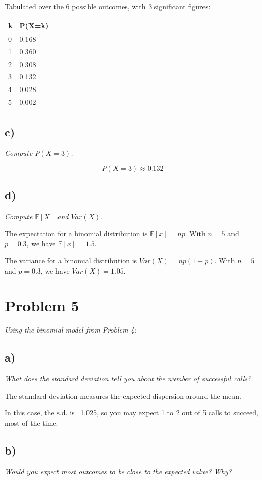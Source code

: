 \documentclass[11pt, oneside]{article}   	%
\begin{document}
Tabulated over the 6 possible outcomes, with 3 significant figures:

\begin{tabular}{|l|l|}\hline
k&P(X=k)\\\hline
0&0.168\\\hline
1&0.360\\\hline
2&0.308\\\hline
3&0.132\\\hline
4&0.028\\\hline
5&0.002\\\hline
\end{tabular}

\subsection*{c)}
\emph{Compute $P(X = 3)$.}

$$
P(X = 3) \approx 0.132
$$

\subsection*{d)}
\emph{Compute $\mathbb{E}[X]$ and $Var(X)$.}

The expectation for a binomial distribution is $\mathbb{E}[x] = np$. With $n=5$ and $p=0.3$, we have $\mathbb{E}[x] = 1.5.$

The variance for a binomial distribution is $Var(X) = np(1-p)$. With $n=5$ and $p=0.3$, we have $Var(X) = 1.05$.

\section*{Problem 5}
\emph{Using the binomial model from Problem 4:}

\subsection*{a)}
\emph{What does the standard deviation tell you about the number of successful calls?}

The standard deviation measures the expected dispersion around the mean.

In this case, the s.d. is ~1.025, so you may expect 1 to 2 out of 5 calls to succeed, most of the time.

\subsection*{b)}
\emph{Would you expect most outcomes to be close to the expected value? Why?}
\end{document}
